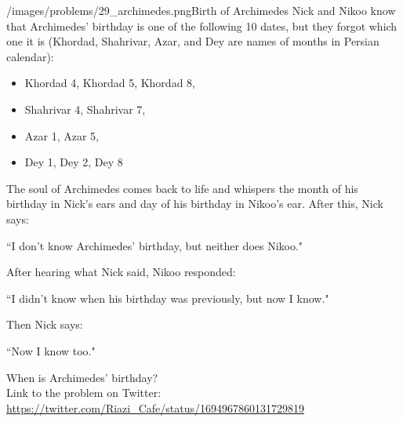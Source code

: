 \begin{problem}{/images/problems/29_archimedes.png}{Birth of Archimedes}
	Nick and Nikoo know that Archimedes' birthday is one of the following 10 dates, but they forgot which one it is (Khordad, Shahrivar, Azar, and Dey are names of months in Persian calendar):

\begin{itemize}
\item  Khordad 4, Khordad 5, Khordad 8,
\item  Shahrivar 4, Shahrivar 7, 
\item Azar 1, Azar 5,
\item  Dey 1, Dey 2, Dey 8
\end{itemize}

The soul of Archimedes comes back to life and whispers the month of his birthday in Nick's ears and day of his birthday in Nikoo's ear. After this, Nick says: 
\begin{center}
``I don't know Archimedes' birthday, but neither does Nikoo."
\end{center}

After hearing what Nick said, Nikoo responded:

\begin{center}
	``I didn't know when his birthday was previously, but now I know."
\end{center}

Then Nick says:

\begin{center}
	``Now I know too."
\end{center}

When is Archimedes' birthday?\\[0.2cm]

Link to the problem on Twitter:  \url{https://twitter.com/Riazi_Cafe/status/1694967860131729819}\end{problem}
